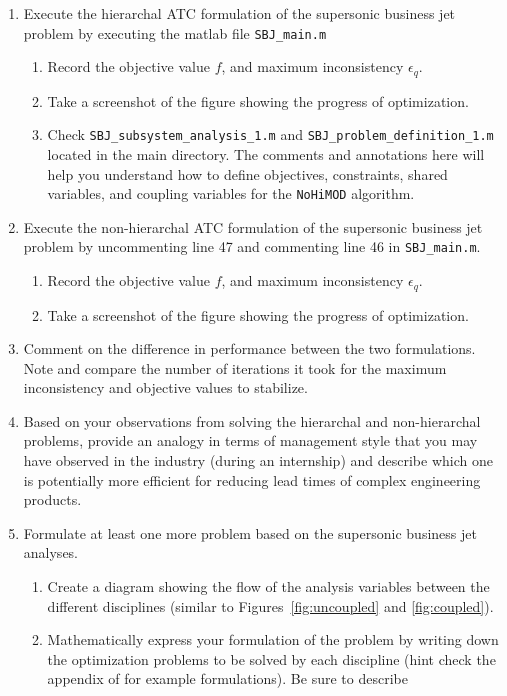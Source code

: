 \documentclass[11pt]{article}
\begin{document}
\begin{enumerate}
  \item Execute the hierarchal \ac{ATC} formulation of the supersonic business jet problem by executing the matlab file \texttt{SBJ\_main.m}
  \begin{enumerate}
    \item Record the objective value $f$, and maximum inconsistency $\epsilon_q$.
    \item Take a screenshot of the figure showing the progress of optimization.
    \item Check \texttt{SBJ\_subsystem\_analysis\_1.m} and \texttt{SBJ\_problem\_definition\_1.m} located in the main directory. The comments and annotations here will help you understand how to define objectives, constraints, shared variables, and coupling variables for the \texttt{NoHiMOD} algorithm.
  \end{enumerate}
  \item Execute the non-hierarchal \ac{ATC} formulation of the supersonic business jet problem by uncommenting line 47 and commenting line 46 in \texttt{SBJ\_main.m}.
  \begin{enumerate}
    \item Record the objective value $f$, and maximum inconsistency $\epsilon_q$.
    \item Take a screenshot of the figure showing the progress of optimization.
  \end{enumerate}
  \item Comment on the difference in performance between the two formulations. Note and compare the number of iterations it took for the maximum inconsistency and objective values to stabilize.
  \item Based on your observations from solving the hierarchal and non-hierarchal problems, provide an analogy in terms of management style that you may have observed in the industry (during an internship) and describe which one is potentially more efficient for reducing lead times of complex engineering products.
  \item Formulate at least one more problem based on the supersonic business jet analyses.
  \begin{enumerate}
    \item Create a diagram showing the flow of the analysis variables between the different disciplines (similar to Figures~\ref{fig:uncoupled} and \ref{fig:coupled}).
    \item Mathematically express your formulation of the problem by writing down the optimization problems to be solved by each discipline (hint check the appendix of \cite{Tosserams2010,Talgorn2017a} for example formulations). Be sure to describe

\end{enumerate}
\end{enumerate}
\end{document}

